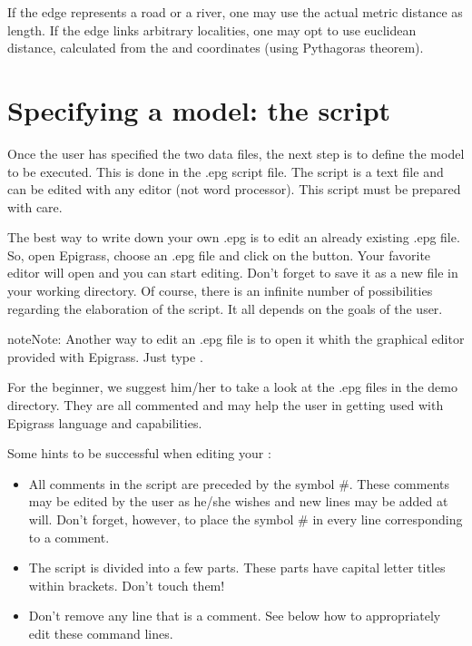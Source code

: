 \documentclass[letterpaper,10pt,english]{sphinxmanual}
\begin{document}
If the edge represents a road or a river, one may use the actual metric distance as length. If the edge links arbitrary localities, one may opt to use euclidean distance, calculated from the  and  coordinates (using Pythagoras theorem).


\section{Specifying a model: the script}
\label{\detokenize{using:specifying-a-model-the-script}}
Once the user has specified the two data files, the next step is to define the model to be executed. This is done in the .epg script file. The    script is a text file and can be edited with any editor (not word processor). This script must be prepared with care.

The best way to write down your own .epg is to edit an already existing .epg file. So, open Epigrass, choose an .epg file and click on the  button. Your favorite editor will open and you can start editing. Don’t forget to save it as a new file in your working directory. Of course, there is an infinite number of possibilities regarding the elaboration of the script. It all depends on the goals of the user.

\begin{sphinxadmonition}{note}{Note:}
Another way to edit an .epg file is to open it whith the graphical editor provided with Epigrass. Just type .
\end{sphinxadmonition}

For the beginner, we suggest him/her to take a look at the .epg files in the demo directory. They are all commented and may help the user in getting used with Epigrass language and capabilities.

Some hints to be successful when editing your   :
\begin{itemize}
\item {} 
All comments in the script are preceded by the symbol \#. These comments may be edited by the user as he/she wishes and new lines may be added at will. Don’t forget, however, to place the symbol \# in every line corresponding to a comment.

\item {} 
The script is divided into a few parts. These parts have capital letter titles within brackets. Don’t touch them!

\item {} 
Don’t remove any line that is  a comment. See below how to appropriately edit these command lines.

\end{itemize}
\end{document}
